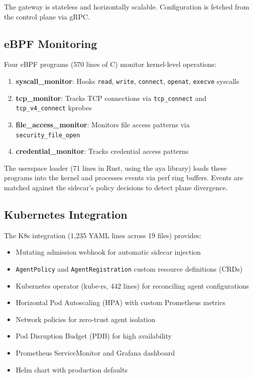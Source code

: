 \documentclass[runningheads]{llncs}
\begin{document}
The gateway is stateless and horizontally scalable. Configuration is fetched from the control plane via gRPC.

\subsection{eBPF Monitoring}

Four eBPF programs (570 lines of C) monitor kernel-level operations:

\begin{enumerate}
\item \textbf{syscall\_monitor}: Hooks \texttt{read}, \texttt{write}, \texttt{connect}, \texttt{openat}, \texttt{execve} syscalls
\item \textbf{tcp\_monitor}: Tracks TCP connections via \texttt{tcp\_connect} and \texttt{tcp\_v4\_connect} kprobes
\item \textbf{file\_access\_monitor}: Monitors file access patterns via \texttt{security\_file\_open}
\item \textbf{credential\_monitor}: Tracks credential access patterns
\end{enumerate}

The userspace loader (71 lines in Rust, using the aya library) loads these programs into the kernel and processes events via perf ring buffers. Events are matched against the sidecar's policy decisions to detect plane divergence.

\subsection{Kubernetes Integration}

The K8s integration (1,235 YAML lines across 19 files) provides:
\begin{itemize}
\item Mutating admission webhook for automatic sidecar injection
\item \texttt{AgentPolicy} and \texttt{AgentRegistration} custom resource definitions (CRDs)
\item Kubernetes operator (kube-rs, 442 lines) for reconciling agent configurations
\item Horizontal Pod Autoscaling (HPA) with custom Prometheus metrics
\item Network policies for zero-trust agent isolation
\item Pod Disruption Budget (PDB) for high availability
\item Prometheus ServiceMonitor and Grafana dashboard
\item Helm chart with production defaults
\end{itemize}
\end{document}
